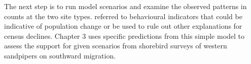 The next step is to run model scenarios and examine the observed patterns in counts at the two site types. \citet{Taylor2007} referred to behavioural indicators that could be indicative of population change or be used to rule out other explanations for census declines. Chapter 3 uses specific predictions from this simple model to assess the support for given scenarios from shorebird surveys of western sandpipers on southward migration.






















